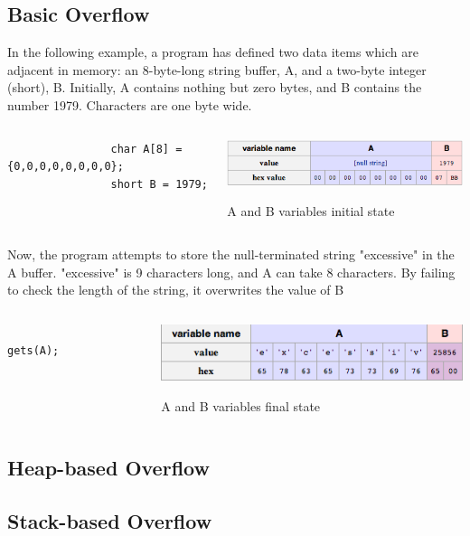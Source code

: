 \subsection{Basic Overflow}
	In the following example, a program has defined two data items which are adjacent in memory: an 8-byte-long string buffer, A, and a two-byte integer (short), B. Initially, A contains nothing but zero bytes, and B contains the number 1979. Characters are one byte wide.
	\begin{columns}[T]
		\begin{column}{.4\textwidth}
			\ccode
			\begin{lstlisting}
				char A[8] = {0,0,0,0,0,0,0,0};
				short B = 1979;
			\end{lstlisting}
		\end{column}
		\begin{column}{.6\textwidth}
			\includegraphics[width=\textwidth]{imgs/initialAB.png}
			\caption{A and B variables initial state}
			\label{fig:initialAB}
		\end{column}
	\end{columns}
\framebreak
	Now, the program attempts to store the null-terminated string "excessive" in the A buffer. "excessive" is 9 characters long, and A can take 8 characters. By failing to check the length of the string, it overwrites the value of B
	\begin{columns}[T]
		\begin{column}{.4\textwidth}
			\ccode
			\begin{lstlisting}
				gets(A);
			\end{lstlisting}
		\end{column}
		\begin{column}{.6\textwidth}
			\includegraphics[width=\textwidth]{imgs/finalAB.png}
			\caption{A and B variables final state}
			\label{fig:finalAB}
		\end{column}
	\end{columns}
\subsection{Heap-based Overflow}
\subsection{Stack-based Overflow}
